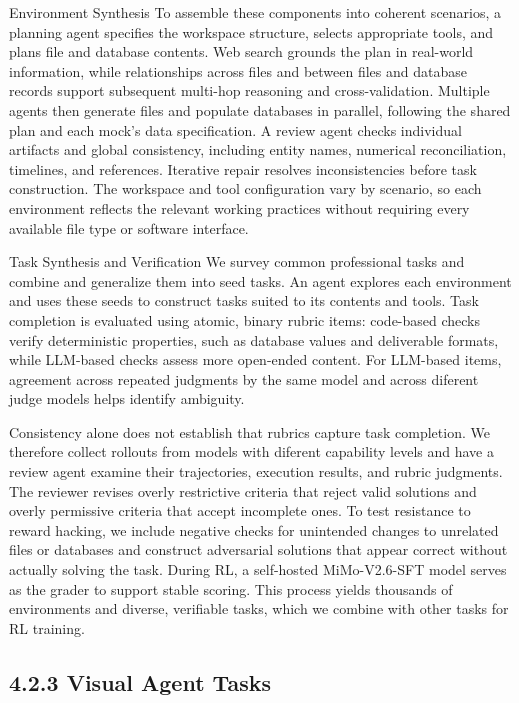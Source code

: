 \documentclass[
  10
]{article}
\begin{document}
Environment Synthesis To assemble these components into coherent
scenarios, a planning agent specifies the workspace structure, selects
appropriate tools, and plans file and database contents. Web search
grounds the plan in real-world information, while relationships across
files and between files and database records support subsequent
multi-hop reasoning and cross-validation. Multiple agents then generate
files and populate databases in parallel, following the shared plan and
each mock's data specification. A review agent checks individual
artifacts and global consistency, including entity names, numerical
reconciliation, timelines, and references. Iterative repair resolves
inconsistencies before task construction. The workspace and tool
configuration vary by scenario, so each environment reflects the
relevant working practices without requiring every available file type
or software interface.

Task Synthesis and Verification We survey common professional tasks and
combine and generalize them into seed tasks. An agent explores each
environment and uses these seeds to construct tasks suited to its
contents and tools. Task completion is evaluated using atomic, binary
rubric items: code-based checks verify deterministic properties, such as
database values and deliverable formats, while LLM-based checks assess
more open-ended content. For LLM-based items, agreement across repeated
judgments by the same model and across diferent judge models helps
identify ambiguity.

Consistency alone does not establish that rubrics capture task
completion. We therefore collect rollouts from models with diferent
capability levels and have a review agent examine their trajectories,
execution results, and rubric judgments. The reviewer revises overly
restrictive criteria that reject valid solutions and overly permissive
criteria that accept incomplete ones. To test resistance to reward
hacking, we include negative checks for unintended changes to unrelated
files or databases and construct adversarial solutions that appear
correct without actually solving the task. During RL, a self-hosted
MiMo-V2.6-SFT model serves as the grader to support stable scoring. This
process yields thousands of environments and diverse, verifiable tasks,
which we combine with other tasks for RL training.

\subsection{4.2.3 Visual Agent Tasks}\label{visual-agent-tasks}
\end{document}
